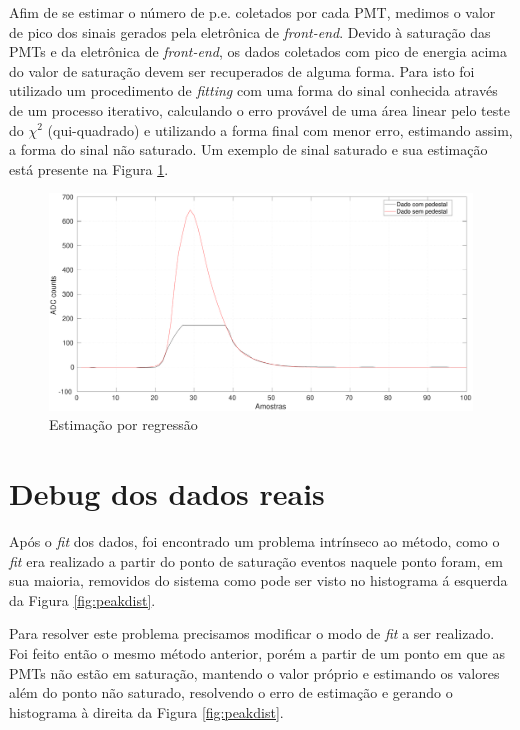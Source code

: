 Afim de se estimar o número de p.e. coletados por cada PMT, medimos o valor de pico dos sinais gerados pela eletrônica de \emph{front-end}. Devido à saturação das PMTs e da eletrônica de \emph{front-end}, os dados coletados com pico de energia acima do valor de saturação devem ser recuperados de alguma forma. Para isto  foi utilizado um procedimento de \emph{fitting} com uma forma do sinal conhecida através de um processo iterativo, calculando o erro provável de uma área linear pelo teste do $\chi^2$ (qui-quadrado) \cite{vuolo1996fundamentos} e utilizando a forma final com menor erro, estimando assim, a forma do sinal não saturado. Um exemplo de sinal saturado e sua estimação está presente na Figura \ref{fig:sat}.


\begin{figure}[H]
	\centering
	\includegraphics[width=12cm]{textuais/dadosreais/figuras/saturado.pdf}
	\caption{Estimação por regressão}
	\label{fig:sat}
\end{figure}



\section{Debug dos dados reais}


Após o \emph{fit} dos dados, foi encontrado um problema intrínseco ao método, como o \emph{fit} era realizado a partir do ponto de saturação eventos naquele ponto foram, em sua maioria, removidos do sistema como pode ser visto no histograma á esquerda da Figura \ref{fig:peakdist}.

Para resolver este problema precisamos modificar o modo de \emph{fit} a ser realizado. Foi feito então o mesmo método anterior, porém a partir de um ponto em que as PMTs não estão em saturação, mantendo o valor próprio e estimando os valores além do ponto não saturado, resolvendo o erro de estimação e gerando o histograma à direita da Figura \ref{fig:peakdist}.


